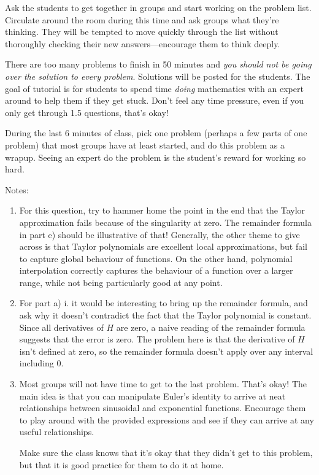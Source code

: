 		Ask the students to get together in groups and
		start working on the problem list. Circulate around the room during
		this time and ask groups what they're thinking. They will be tempted
		to move quickly through the list without thoroughly checking their
		new answers---encourage them to think deeply.

		There are too many problems to finish in 50 minutes and \emph{you should not be going
		over the solution to every problem}. Solutions will be posted for the students. The goal
		of tutorial is for students to spend time \emph{doing} mathematics with an expert around
		to help them if they get stuck. Don't feel any time pressure, even if you only get through 1.5
		questions, that's okay!

		During the last 6 minutes of class, pick one problem (perhaps a few parts of one problem)
		that most groups have at least started, and do this problem as a wrapup. Seeing an expert do the
		problem is the student's reward for working so hard.

		Notes:
		\begin{enumerate}

                \item For this question, try to hammer home the point in the end that the Taylor approximation fails because of the singularity at zero. The remainder formula in part e) should be illustrative of that! 
                Generally, the other theme to give across is that Taylor polynomials are excellent local approximations, but fail to capture global behaviour of functions. On the other hand, polynomial interpolation correctly captures the behaviour of a function over a larger range, while not being particularly good at any point. 
                \item For part a) i. it would be interesting to bring up the remainder formula, and ask why it doesn't contradict the fact that the Taylor polynomial is constant. Since all derivatives of $H$ are zero, a naive reading of the remainder formula suggests that the error is zero. The problem here is that the derivative of $H$ isn't defined at zero, so the remainder formula doesn't apply over any interval including $0$. 

                
			\item Most groups will not have time to get to the last problem. That's okay! The main idea is that you can manipulate Euler's identity to arrive at neat relationships between sinusoidal and exponential functions. Encourage them to play around with the provided expressions and see if they can arrive at any useful relationships.

			Make sure the class knows that it's okay that they didn't get to this problem, but that it is good practice for them to do it at home.
		\end{enumerate}
